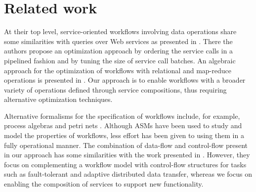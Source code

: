 
\section{Related work} \label{sec:relatedwork}

At their top level, service-oriented workflows involving data operations share some similarities with queries over Web services as presented in \cite{Srivastava:2006:QOO:1182635.1164159}. There the authors propose an optimization approach by ordering the service calls in a pipelined fashion and by tuning the size of service call batches. An algebraic approach for the optimization of workflows with relational and map-reduce operations is presented in \cite{DBLP:journals/pvldb/OgasawaraOVDPM11}. Our approach is to enable workflows with a broader variety of operations defined through service compositions, thus requiring alternative optimization techniques.

Alternative formalisms for the specification of workflows include, for example, process algebras \cite{Curcin:2011:STW:2048456.2048467} and petri nets \cite{Hidders:2008:DDL:1340791.1340907}. Although ASMs have been used to study and model the properties of workflows, less effort has been given to using them in a fully operational manner. The combination of data-flow and control-flow present in our approach has some similarities with the work presented in \cite{Bowers:2006:ESR:1129755.1130113}. However, they focus on complementing a workflow model with control-flow structures for tasks such as fault-tolerant and adaptive distributed data transfer, whereas we focus on enabling the composition of services to support new functionality.


